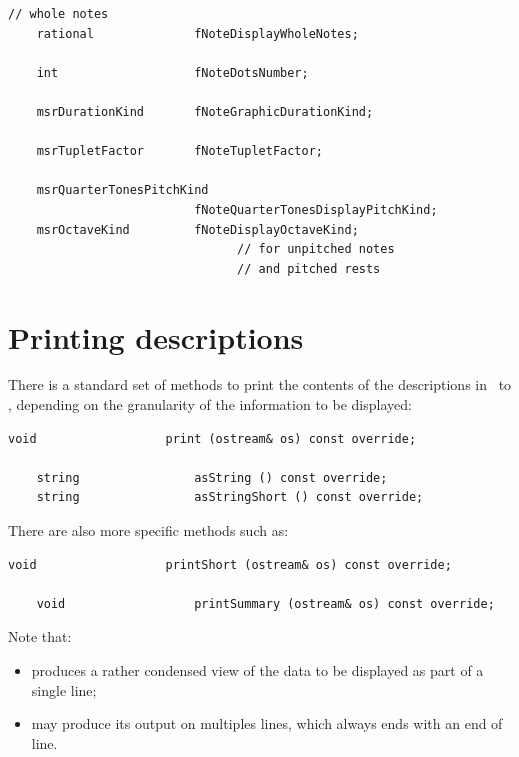 \begin{lstlisting}[language=CPlusPlus]
    // whole notes
    rational              fNoteDisplayWholeNotes;

    int                   fNoteDotsNumber;

    msrDurationKind       fNoteGraphicDurationKind;

    msrTupletFactor       fNoteTupletFactor;

    msrQuarterTonesPitchKind
                          fNoteQuarterTonesDisplayPitchKind;
    msrOctaveKind         fNoteDisplayOctaveKind;
                                // for unpitched notes
                                // and pitched rests
\end{lstlisting}


\section{Printing descriptions}\label{Printing descriptions}

There is a standard set of methods to print the contents of the descriptions in \mf\ to \standardOutput, depending on the granularity of the information to be displayed:
\begin{lstlisting}[language=CPlusPlus]
    void                  print (ostream& os) const override;

    string                asString () const override;
    string                asStringShort () const override;
\end{lstlisting}

There are also more specific methods such as:
\begin{lstlisting}[language=CPlusPlus]
    void                  printShort (ostream& os) const override;

    void                  printSummary (ostream& os) const override;
\end{lstlisting}

Note that:
\begin{itemize}
\item {} produces a rather condensed view of the data to be displayed as part of a single line;
\item {} may produce its output on multiples lines, which always ends with an end of line.
\end{itemize}

